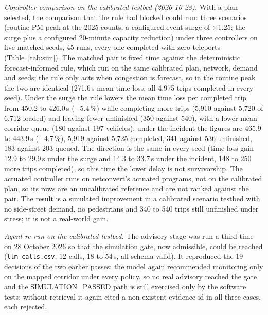 \textit{Controller comparison on the calibrated testbed (2026-10-28).} With a plan selected, the comparison that the
rule had blocked could run: three scenarios (routine PM peak at the 2025 counts; a configured event surge of
$\times$1.25; the surge plus a configured 20-minute capacity reduction) under three controllers on five matched seeds,
45 runs, every one completed with zero teleports (Table~\ref{tab:sim}). The matched pair is fixed time against the
deterministic forecast-informed rule, which run on the same calibrated plan, network, demand and seeds; the rule only
acts when congestion is forecast, so in the routine peak the two are identical (271.6\,s mean time loss, all 4{,}975
trips completed in every seed). Under the surge the rule lowers the mean time loss per completed trip from 450.2 to
426.0\,s ($-5.4$\,\%) while completing more trips (5{,}910 against 5{,}720 of 6{,}712 loaded) and leaving fewer
unfinished (350 against 540), with a lower mean corridor queue (180 against 197 vehicles); under the incident the
figures are 465.9 to 443.9\,s ($-4.7$\,\%), 5{,}919 against 5{,}725 completed, 341 against 536 unfinished, 183 against
203 queued. The direction is the same in every seed (time-loss gain 12.9 to 29.9\,s under the surge and 14.3 to
33.7\,s under the incident, 148 to 250 more trips completed), so this time the lower delay is not survivorship. The
actuated controller runs on netconvert's actuated programs, not on the calibrated plan, so its rows are an
uncalibrated reference and are not ranked against the pair. The result is a simulated improvement in a calibrated
scenario testbed with no side-street demand, no pedestrians and 340 to 540 trips still unfinished under stress; it is
not a real-world gain.

\textit{Agent re-run on the calibrated testbed.} The advisory stage was run a third time on 28 October 2026 so that the
simulation gate, now admissible, could be reached (\texttt{llm\_calls.csv}, 12 calls, 18 to 54\,s, all schema-valid).
It reproduced the 19 decisions of the two earlier passes: the model again recommended monitoring only on the mapped
corridor under every policy, so no real advisory reached the gate and the SIMULATION\_PASSED path is still exercised
only by the software tests; without retrieval it again cited a non-existent evidence id in all three cases, each
rejected.

